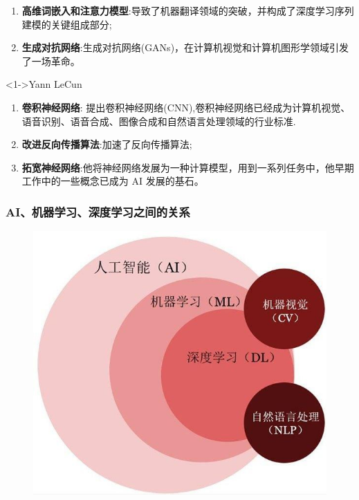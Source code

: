 \documentclass[10pt,aspectratio=43,mathserif,table]{beamer}
\begin{document}
\begin{frame}[allowframebreaks]
\begin{block}
\begin{enumerate}
			\item<1-> {\color{blue}\textbf{高维词嵌入和注意力模型}}:导致了机器翻译领域的突破，并构成了深度学习序列建模的关键组成部分;
			\item<1->  {\color{blue}\textbf{生成对抗网络}}:生成对抗网络(GANs)，在计算机视觉和计算机图形学领域引发了一场革命。
		\end{enumerate}
	\end{block}
	\framebreak
	\begin{block}<1->{Yann LeCun}
		\begin{enumerate}
			\item<1-> {\color{blue}\textbf{卷积神经网络}}: 提出卷积神经网络(CNN),卷积神经网络已经成为计算机视觉、语音识别、语音合成、图像合成和自然语言处理领域的行业标准.
			\item<1->  {\color{blue}\textbf{改进反向传播算法}}:加速了反向传播算法;
			\item<1->  {\color{blue}\textbf{拓宽神经网络}}:他将神经网络发展为一种计算模型，用到一系列任务中，他早期工作中的一些概念已成为 AI 发展的基石。
		\end{enumerate}
	\end{block}
\end{frame}
\begin{frame}
	\frametitle{AI、机器学习、深度学习之间的关系}
	\begin{figure}[htbp]
		\centering
		\includegraphics[width=0.5\paperwidth]{figures/guanxi.jpeg}
	\end{figure}
\end{frame}
\end{document}

